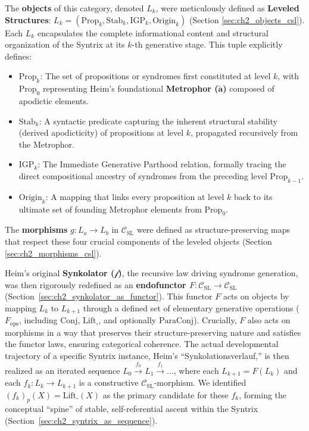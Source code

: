 \documentclass[
    12pt,              %
    a4paper,           %
    headings=normal,   %
    twoside=true,      %
    BCOR=8mm,          %
]{scrbook}
\newcommand{\q}[1]{\enquote{#1}}
\newcommand{\metrophor}{\bm{\widetilde{a}}}
\newcommand{\synkolator}{\mathcal{f}}
\newcommand{\BoxSyn}{\square}
\newcommand{\fops}{F_{\text{ops}}}
\begin{document}
The \textbf{objects} of this category, denoted \(L_k\), were meticulously defined as \textbf{Leveled Structures}: \(L_k = ( \text{Prop}_k, \text{Stab}_k, \text{IGP}_k, \text{Origin}_k )\) (Section \ref{sec:ch2_objects_csl}). Each \(L_k\) encapsulates the complete informational content and structural organization of the Syntrix at its \(k\)-th generative stage. This tuple explicitly defines:
\begin{itemize}
    \item   \(\text{Prop}_k\): The set of propositions or syndromes first constituted at level \(k\), with \(\text{Prop}_0\) representing Heim's foundational \textbf{Metrophor (\(\metrophor\))} composed of apodictic elements.
    \item   \(\text{Stab}_k\): A syntactic predicate capturing the inherent structural stability (derived apodicticity) of propositions at level \(k\), propagated recursively from the Metrophor.
    \item   \(\text{IGP}_k\): The Immediate Generative Parthood relation, formally tracing the direct compositional ancestry of syndromes from the preceding level \(\text{Prop}_{k-1}\).
    \item   \(\text{Origin}_k\): A mapping that links every proposition at level \(k\) back to its ultimate set of founding Metrophor elements from \(\text{Prop}_0\).
\end{itemize}
The \textbf{morphisms} \(g: L_a \to L_b\) in \(\mathcal{C}_{\text{SL}}\) were defined as structure-preserving maps that respect these four crucial components of the leveled objects (Section \ref{sec:ch2_morphisms_csl}).

Heim's original \textbf{Synkolator (\(\synkolator\))}, the recursive law driving syndrome generation, was then rigorously redefined as an \textbf{endofunctor \(F: \mathcal{C}_{\text{SL}} \to \mathcal{C}_{\text{SL}}\)} (Section~\ref{sec:ch2_synkolator_as_functor}). This functor \(F\) acts on objects by mapping \(L_k\) to \(L_{k+1}\) through a defined set of elementary generative operations (\(\fops\), including \(\text{Conj}\), \(\text{Lift}_\BoxSyn\), and optionally \(\text{ParaConj}\)). Crucially, \(F\) also acts on morphisms in a way that preserves their structure-preserving nature and satisfies the functor laws, ensuring categorical coherence. The actual developmental trajectory of a specific Syntrix instance, Heim’s \q{Synkolationsverlauf,} is then realized as an iterated sequence \(L_0 \xrightarrow{f_0} L_1 \xrightarrow{f_1} \ldots\), where each \(L_{k+1} = F(L_k)\) and each \(f_k: L_k \to L_{k+1}\) is a constructive \(\mathcal{C}_{\text{SL}}\)-morphism. We identified \( (f_k)_p(X) = \text{Lift}_\BoxSyn(X) \) as the primary candidate for these \(f_k\), forming the conceptual \q{spine} of stable, self-referential ascent within the Syntrix (Section~\ref{sec:ch2_syntrix_as_sequence}).
\end{document}

